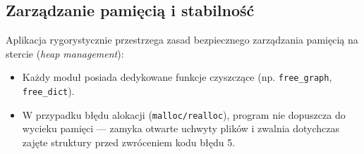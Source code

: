 \documentclass[12pt,a4paper]{article}
\begin{document}
\subsection{Zarządzanie pamięcią i stabilność}
Aplikacja rygorystycznie przestrzega zasad bezpiecznego zarządzania pamięcią na stercie (\textit{heap management}):
\begin{itemize}
    \item Każdy moduł posiada dedykowane funkcje czyszczące (np. \texttt{free\_graph}, \texttt{free\_dict}).
    \item W przypadku błędu alokacji (\texttt{malloc/realloc}), program nie dopuszcza do wycieku pamięci — zamyka otwarte uchwyty plików i zwalnia dotychczas zajęte struktury przed zwróceniem kodu błędu 5.
\end{itemize}
\end{document}
